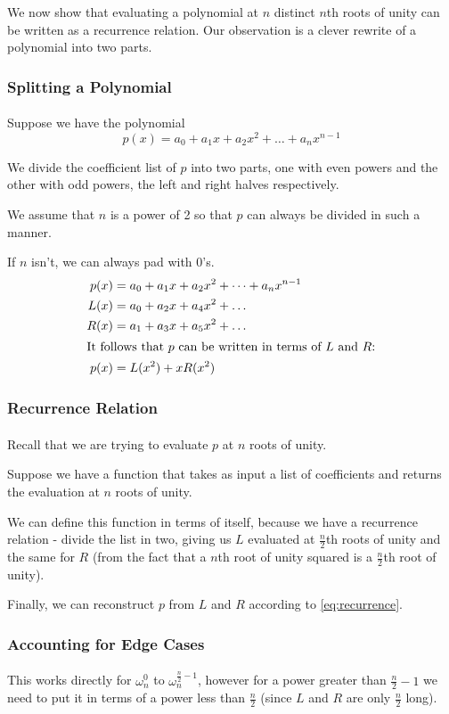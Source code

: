 \documentclass[11pt,handout]{beamer}             %
\begin{document}
\begin{frame}
\frametitle{}
\framesubtitle{}
We now show that evaluating a polynomial at \( n \) distinct \( n \)th roots of
unity can be written as a recurrence relation.
Our observation is a clever rewrite of a polynomial into two parts.
\end{frame}

\begin{frame}
\frametitle{Splitting a Polynomial}
\framesubtitle{}
Suppose we have the polynomial
\[ p(x) = a_0 + a_1 x + a_2 x^2 + \dots + a_n x^{n - 1} \]

We divide the coefficient list of \( p \) into two parts,
one with even powers and the other with odd powers,
the left and right halves respectively. \pause

We assume that \( n \) is a power of 2 so that \( p \)
can always be divided in such a manner. 

If \( n \) isn't, we can always pad with 0's. \pause
\begin{align}
  p(x) &= a_0 + a_1 x + a_2 x^2 + \dots + a_n x^{n - 1} \\
  L(x) &= a_0 + a_2 x + a_4 x^2 + \dots \\
  R(x) &= a_1 + a_3 x + a_5 x^2 + \dots \\
  \shortintertext{It follows that \( p \) can be written
  in terms of \( L \) and \( R \):}
  p(x) &= L(x^2) + x R(x^2) \label{eq:recurrence} 
\end{align}
\end{frame}

\begin{frame}
\frametitle{Recurrence Relation}
\framesubtitle{}
Recall that we are trying to evaluate \( p \) at \( n \) roots of unity. \pause

Suppose we have a function that takes as input a list of coefficients
and returns the evaluation at \( n \) roots of unity. \pause

We can define this function in terms of itself, because we have a recurrence
relation - divide the list in two, giving us \( L \) evaluated at 
\( \frac{n}{2} \)th roots of unity and the same for \( R \)
(from the fact that a \( n \)th root of unity squared
is a \( \frac{n}{2} \)th root of unity). \pause

Finally, we can reconstruct \( p \) from \( L \) and \( R \)
according to \eqref{eq:recurrence}.
\end{frame}

\begin{frame}
\frametitle{Accounting for Edge Cases}
\framesubtitle{}
This works directly for \( \omega^0_n \)
to \( \omega^{\frac{n}{2} - 1}_n \), however for a power greater than
\( \frac{n}{2} - 1 \) we need to put it in terms of a power less than
\( \frac{n}{2} \) (since \( L \) and \( R \) are only \( \frac{n}{2} \) long).
\end{frame}
\end{document}

